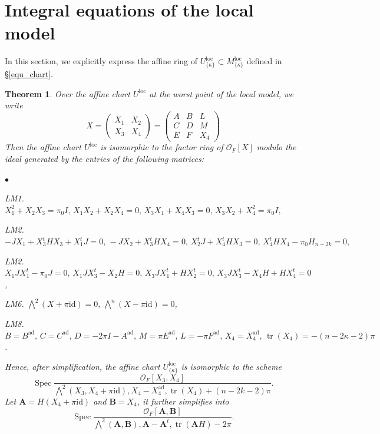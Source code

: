 \documentclass[pdflatex,sn-mathphys-num]{sn-jnl}%
\theoremstyle{thmstyleone}%
\newtheorem{theorem}[subsubsection]{Theorem}%
\theoremstyle{thmstyletwo}%
\numberwithin{equation}{subsection}
\theoremstyle{thmstylethree}%
\newcommand{\bA}{\ensuremath{\mathbf{A}}\xspace}
\newcommand{\bB}{\ensuremath{\mathbf{B}}\xspace}
\newcommand{\CO}{\ensuremath{\mathcal{O}}\xspace}
\newcommand{\ad}{\mathrm{ad}}
\newcommand{\id}{\ensuremath{\mathrm{id}}\xspace}
\newcommand{\loc}{\ensuremath{\mathrm{loc}}\xspace}
\DeclareMathOperator{\Spec}{Spec}
\DeclareMathOperator{\tr}{tr}
\newenvironment{altitemize}
	{\begin{list}
			{$\bullet$}
			{\setlength{\labelwidth}{0pt}
				\setlength{\itemindent}{5pt}
				\setlength{\labelsep}{5pt}
				\setlength{\leftmargin}{0pt}
				\setlength{\itemsep}{\the\smallskipamount}
		}}
		{\end{list}}
\begin{document}
		
		
\section{Integral equations of the local model}\label{intequ}
		
		
In this section, we explicitly express the affine ring of $U_{\{\kappa\}}^\loc\subset M_{\{\kappa\}}^\loc$ defined in \S \ref{equ_chart}.
		
		
\begin{theorem}\label{intequ:main}
Over the affine chart $U^\loc$ at the worst point of the local model, we write
\[
    X=\left(\begin{array}{c|c}
	X_1&X_2\\
	\hline
	X_3&X_4
	\end{array}\right)=
	\left(\begin{array}{cc|c}
		A&B&L\\
		C&D&M\\
		\hline
		E&F&X_4
	\end{array}\right)
\]
Then the affine chart $U^\loc$ is isomorphic to the factor ring of $\mathscr{O}_F[X]$ modulo the ideal generated by the entries of the following matrices:
\begin{altitemize}
	\item[\fontfamily{cmtt}\selectfont LM1.] $X_1^2+X_2X_3=\pi_0 I,\, X_1X_2+X_2X_4=0,\, X_3X_1+X_4X_3=0,\, X_3X_2+X_4^2=\pi_0I,$
	\item[\fontfamily{cmtt}\selectfont LM2.] $-JX_1+X_3^tHX_3+X_1^tJ=0,\, -JX_2+X_3^tHX_4=0,\, X_2^tJ+X_4^tHX_3=0,\, X_4^tHX_4-\pi_0 H_{n-2k}=0,$
	\item[\fontfamily{cmtt}\selectfont  LM2.] $X_1JX_1^t-\pi_0J=0,\, X_1JX_3^t-X_2H=0,\, X_3JX_1^t+HX_2^t=0,\, X_3JX_3^t-X_4H+HX_4^t=0$,
	\item[\fontfamily{cmtt}\selectfont  LM6.] $\bigwedge^2(X+\pi\id)=0,\, \bigwedge^n(X-\pi\id)=0$,
	\item[\fontfamily{cmtt}\selectfont  LM8.] $B=B^{\ad},\, C=C^{\ad},\, D=-2\pi I-A^{\ad},\, M=\pi E^{\ad},\, L=-\pi F^{\ad},\, X_4=X_4^{\ad},\, \tr(X_4)=-(n-2\kappa-2)\pi$.
\end{altitemize}
Hence, after simplification, the affine chart $U^\loc_{\{\kappa\}}$ is isomorphic to the scheme
\begin{equation*}
	\Spec\frac{\CO_F[X_3,X_4]}{\bigwedge^2(X_3,X_4+\pi\id),X_4-X_4^{\ad},\tr(X_4)+(n-2k-2)\pi}.
\end{equation*}
Let $\bA=H(X_4+\pi\id)$ and $\bB=X_4$, it further simplifies into
\begin{equation*}
	\Spec\frac{\CO_F[\bA,\bB]}{\bigwedge^2(\bA,\bB),\bA-\bA^{t},\tr(\bA H)-2\pi}.
\end{equation*}
\end{theorem}
		
\end{document}
